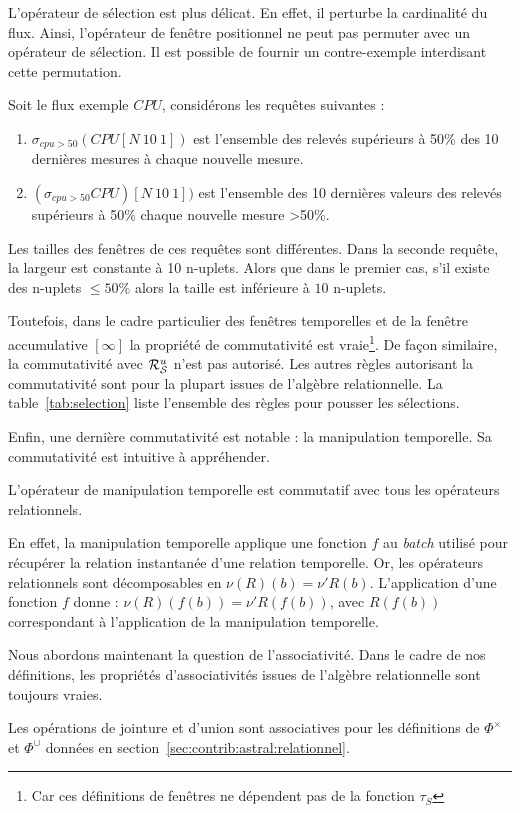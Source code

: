 L'opérateur de sélection est plus délicat. En effet, il perturbe la cardinalité du flux. Ainsi, l'opérateur de fenêtre positionnel ne peut pas permuter avec un opérateur de sélection. Il est possible de fournir un contre-exemple interdisant cette permutation.
\begin{example}
Soit le flux exemple $CPU$, considérons les requêtes suivantes :
\begin{enumerate}
	\item $\sigma_{cpu>50} (CPU[N\ 10\ 1])$ est l'ensemble des relevés supérieurs à 50\% des 10 dernières mesures à chaque nouvelle mesure.
	\item $(\sigma_{cpu>50} CPU)[N\ 10\ 1])$ est l'ensemble des 10 dernières valeurs des relevés supérieurs à 50\% chaque nouvelle mesure >50\%.
\end{enumerate}
Les tailles des fenêtres de ces requêtes sont différentes. Dans la seconde requête, la largeur est constante à 10 n-uplets. Alors que dans le premier cas, s'il existe des n-uplets $\leq 50\%$ alors la taille est inférieure à $10$ n-uplets.
\end{example}
Toutefois, dans le cadre particulier des fenêtres temporelles et de la fenêtre accumulative $[\infty]$ la propriété de commutativité est vraie\footnote{Car ces définitions de fenêtres ne dépendent pas de la fonction $\tau_S$}. De façon similaire, la commutativité avec $\mathcal{R}_{\mathcal S}^{u}$ n'est pas autorisé. Les autres règles autorisant la commutativité sont pour la plupart issues de l'algèbre relationnelle. La table~\ref{tab:selection} liste l'ensemble des règles pour pousser les sélections.

Enfin, une dernière commutativité est notable : la manipulation temporelle. Sa commutativité est intuitive à appréhender.
\begin{prop}\label{prop:commut:manipulation}
L'opérateur de manipulation temporelle est commutatif avec tous les opérateurs relationnels.
\end{prop}
En effet, la manipulation temporelle applique une fonction $f$ au \textit{batch} utilisé pour récupérer la relation instantanée d'une relation temporelle. Or, les opérateurs relationnels sont décomposables en $\nu (R)(b) = \nu' R(b)$. L'application d'une fonction $f$ donne : $\nu (R)(f(b)) = \nu' R(f(b))$, avec $R(f(b))$ correspondant à l'application de la manipulation temporelle.

Nous abordons maintenant la question de l'associativité. Dans le cadre de nos définitions, les propriétés d'associativités issues de l'algèbre relationnelle sont toujours vraies.
\begin{prop}
Les opérations de jointure et d'union sont associatives pour les définitions de $\Phi^\times$ et $\Phi^\cup$ données en section~\ref{sec:contrib:astral:relationnel}.
\end{prop}

